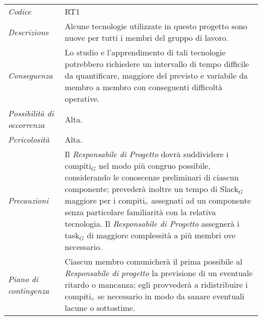 \def\tabularxcolumn#1{m{#1}}
{

	\begin{center}
		\renewcommand{\arraystretch}{1.4}
		\begin{longtable}{|p{5cm}|p{12cm}|}
			\hline
			\rowcolor{airforceblue}
			\multicolumn{2}{|c|}{\textit{Inesperienza tecnologica}}\\
			\hline
			\textit{Codice} & RT1 \\
			\hline
			\textit{Descrizione} & Alcune tecnologie utilizzate in questo progetto sono nuove per tutti i membri del gruppo di lavoro. \\
			\hline
			\textit{Conseguenza} & Lo studio e l'apprendimento di tali tecnologie potrebbero richiedere un intervallo di tempo difficile da quantificare, maggiore del previsto e variabile da membro a membro con conseguenti difficoltà operative. \\
			\hline
			\textit{Possibilità di occorrenza} & Alta. \\
			\hline
			\textit{Pericolosità} & Alta. \\
			\hline
			\textit{Precauzioni} & Il \textit{Responsabile di Progetto} dovrà suddividere i compiti$_G$ nel modo più congruo possibile, considerando le conoscenze preliminari di ciascun componente; prevederà inoltre un tempo di Slack$_G$ maggiore per i compiti$_{\scaleto{G}{3pt}}$ assegnati ad un componente senza particolare familiarità con la relativa tecnologia. Il \textit{Responsabile di Progetto} assegnerà i task$_G$ di maggiore complessità a più membri ove necessario.  \\
			\hline
			\textit{Piano di contingenza} & Ciascun membro comunicherà il prima possibile al \textit{Responsabile di progetto} la previsione di un eventuale ritardo o mancanza; egli provvederà a ridistribuire i compiti$_{\scaleto{G}{3pt}}$ se necessario in modo da sanare eventuali lacune o sottostime. \\
			\hline
		\end{longtable}
	\end{center}


\def\tabularxcolumn#1{m{#1}}
{

}}

